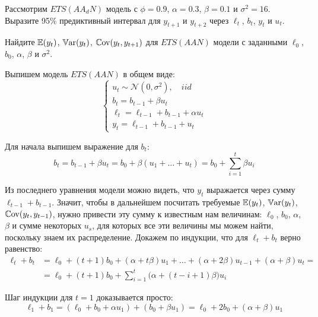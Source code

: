 \begin{problem}
Рассмотрим $ETS(AA_dN)$ модель с $\phi = 0.9$, $\alpha=0.3$, $\beta=0.1$ и $\sigma^2=16$. 
Выразите 95\% предиктивный интервал для $y_{t+1}$ и $y_{t+2}$ через $\ell_t$, $b_t$, $y_t$ и $u_t$. 
\begin{sol}
\end{sol}
\end{problem}

\begin{problem}
Найдите $\operatorname{\mathbb{E}}(y_t)$, $\operatorname{\mathbb{V}\mathrm{ar}}(y_t)$, $\operatorname{\mathbb{C}\mathrm{ov}}(y_t, y_{t+1})$ для $ETS(AAN)$ модели с заданными $\ell_0$, $b_0$, $\alpha$, $\beta$ и $\sigma^2$.
\begin{sol}
  Выпишем модель $ETS(AAN)$ в общем виде:
  \[
      \begin{cases}
          u_t \sim \mathcal{N}(0, \sigma^2), \quad iid \\
          b_t = b_{t-1} + \beta u_t \\
          \ell_t = \ell_{t-1} + b_{t-1} + \alpha u_t \\
          y_t = \ell_{t-1} + b_{t-1} + u_t
      \end{cases}
  \]
  
  Для начала выпишем выражение для $b_t$:
  \[
      b_t = b_{t-1} + \beta u_t = b_0 + \beta(u_1 + \ldots + u_t) = b_0 + \sum_{i = 1}^t \beta u_i
  \]
  
  Из последнего уравнения модели можно видеть, что $y_t$ выражается через сумму $\ell_{t-1} + b_{t-1}$. 
  Значит, чтобы в дальнейшем посчитать требуемые $\operatorname{\mathbb{E}}(y_t)$, $\operatorname{\mathbb{V}\mathrm{ar}}(y_t)$, $\operatorname{\mathbb{C}\mathrm{ov}}(y_t, y_{t-1})$, нужно привести эту сумму к известным нам величинам: $\ell_0$, $b_0$, $\alpha$, $\beta$ и сумме некоторых $u_s$, для которых все эти величины мы можем найти, поскольку знаем их распределение. Докажем по индукции, что для $\ell_{t} + b_{t}$ верно равенство:
  \begin{align*}
      \ell_{t} + b_{t} 
      &= \ell_0 + (t + 1) b_0 + (\alpha + t\beta) u_1 + \ldots + (\alpha + 2\beta) u_{t-1} + (\alpha + \beta) u_t = \\
      &= \ell_0 + (t + 1) b_0 + \sum_{i = 1}^t \big(\alpha + (t - i + 1)\beta\big) u_i
  \end{align*}
  
  Шаг индукции для $t = 1$ доказывается просто:
  \[
      \ell_1 + b_1 = (\ell_0 + b_0 + \alpha u_1) + (b_0 + \beta u_1) = \ell_0 + 2 b_0 + (\alpha + \beta) u_1
  \]
  

\end{sol}
\end{problem}
